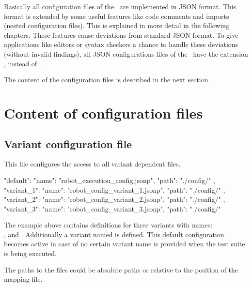 Basically all configuration files of the \pkg\ are implemented in JSON format. This format is extended by some useful features like
code comments and imports (nested configuration files). This is explained in more detail in the following chapters.
These features cause deviations from standard JSON format. To give applications like editors or syntax checkers a chance to handle
these deviations (without invalid findings), all JSON configurations files of the \pkg\ have the extension , instead of .

The content of the configuration files is described in the next section.


\section{Content of configuration files}

\subsection{Variant configuration file}

This file configures the access to all variant dependent  files.

\begin{pythoncode}
{
  "default": {
               "name": "robot_execution_config.jsonp",
               "path": "./config/"
             },
  "variant_1": {
                 "name": "robot_config_variant_1.jsonp",
                 "path": "./config/"
               },
  "variant_2": {
                 "name": "robot_config_variant_2.jsonp",
                 "path": "./config/"
               },
  "variant_3": {
                 "name": "robot_config_variant_3.jsonp",
                 "path": "./config/"
               }
}
\end{pythoncode}

The example above contains definitions for three variants with names:\\
,  and . Additionally a variant named  is defined.
This default configuration becomes active in case of no certain variant name is provided when the test suite is being executed.

The paths to the  files could be absolute paths or relative to the position of the mapping file.


